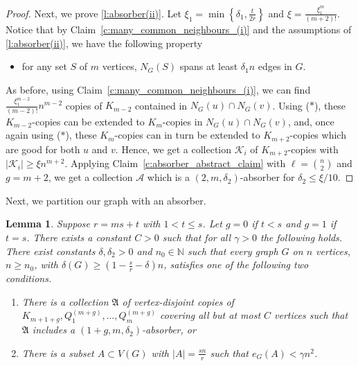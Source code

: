 \documentclass[reqno, 12pt]{amsart}
\numberwithin{equation}{section}
\numberwithin{figure}{section}
\theoremstyle{plain}
\newtheorem{lemma}[thm]{Lemma}
\theoremstyle{definition}
\def\cA{{\mathcal A}}
\def\cK{{\mathcal K}}
\def\fA{\mathfrak{A}}
\begin{document}
\begin{proof}
        Next, we prove \ref{l:absorber(ii)}. Let $\xi_1=\min\left\{\delta_1,\frac{t}{2r}\right\}$ and $\xi=\frac{\xi_1^{m}}{(m+2)!}$. Notice that by Claim~\ref{c:many_common_neighbours_(i)} and the assumptions of \ref{l:absorber(ii)}, we have the following property
        \begin{itemize}
            \item[($\ast$)] for any set $S$ of $m$ vertices, $N_G(S)$ spans at least $\delta_1n$ edges in $G$.
        \end{itemize} 
        As before, using Claim~\ref{c:many_common_neighbours_(i)}, we can find $\frac{\xi_1^{m-2}}{(m-2)!}n^{m-2}$ copies of $K_{m-2}$ contained in $N_G(u)\cap N_G(v)$. Using ($\ast$), these $K_{m-2}$-copies can be extended to $K_{m}$-copies in $N_G(u)\cap N_G(v)$, and, once again using ($\ast$), these $K_m$-copies can in turn be extended to $K_{m+2}$-copies which are good for both $u$ and $v$. Hence, we get a collection $\cK_i$ of $K_{m+2}$-copies with $|\cK_i|\geq \xi n^{m+2}$. Applying Claim~\ref{c:absorber_abstract_claim} with $\ell= \binom n2$ and $g=m+2$, we get a collection $\cA$ which is a $(2,m,\delta_2)$-absorber for $\delta_2\leq \xi/10$.
    \end{proof}
    
    Next, we partition our graph with an absorber.

    \begin{lemma}\label{l:covering-with-absorber}
        Suppose $r=ms+t$ with $1<t\leq s$. Let $g = 0$ if $t<s$ and $g=1$ if $t=s$. There exists a constant $C>0$ such that for all $\gamma>0$ the following holds. There exist constants $\delta , \delta_2>0$ and $n_0\in\mathbb{N}$ such that every graph $G$ on $n$ vertices, $n\geq n_0$, with $\delta(G)\geq \left(1-\frac{s}{r}-\delta\right)n$, satisfies one of the following two conditions.
        \begin{enumerate}[label= (\roman*)]
            \item\label{l:covering-with-absorber(i)} There is a collection $\fA$ of vertex-disjoint copies of $K_{m+1+g}, Q_1^{(m+g)}, \dots , Q_{m}^{(m+g)}$ covering all but at most $C$ vertices such that $\fA$ includes a $(1+g,m,\delta_2)$-absorber, or
            \item\label{l:covering-with-absorber(ii)} There is a subset $A\subset V(G)$ with $|A|=\frac{sn}{r}$ such that $e_G(A) < \gamma n^2$. 
        \end{enumerate}
    \end{lemma}
    
\end{document}
